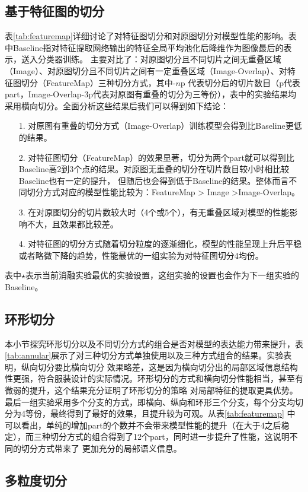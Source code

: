 \subsection{基于特征图的切分}

表\ref{tab:featuremap}详细讨论了对特征图切分和对原图切分对模型性能的影响。表中Baseline指对特征提取网络输出的特征全局平均池化后降维作为图像最后的表示，送入分类器训练。
主要对比了：对原图切分且不同切片之间无重叠区域（Image）、对原图切分且不同切片之间有一定重叠区域（Image-Overlap）、对特征图切分（FeatureMap）三种切分方式，其中-$n$p
代表切分后的切片数目（p代表part，Image-Overlap-3p代表对原图有重叠的切分为三等份），表中的实验结果均采用横向切分。全面分析这些结果后我们可以得到如下结论：
\begin{itemize}
  \item[1.]对原图有重叠的切分方式（Image-Overlap）训练模型会得到比Baseline更低的结果。
  \item[2.]对特征图切分（FeatureMap）的效果显著，切分为两个part就可以得到比Baseline高2到3个点的结果。对原图无重叠的切分在切片数目较小时相比较Baseline也有一定的提升，
    但随后也会得到低于Baseline的结果。整体而言不同切分方式对应的模型性能比较为：FeatureMap > Image >Image-Overlap。
  \item[3.]在对原图切分的切片数较大时（4个或5个），有无重叠区域对模型的性能影响不大，且效果都比较差。
  \item[4.]对特征图的切分方式随着切分粒度的逐渐细化，模型的性能呈现上升后平稳或者略微下降的趋势，性能最优的一组实验为对特征图切分4均份。
\end{itemize}

表中$\star$表示当前消融实验最优的实验设置，这组实验的设置也会作为下一组实验的Baseline。
\subsection{环形切分}
本小节探究环形切分以及不同切分方式的组合是否对模型的表达能力带来提升，表\ref{tab:annular}展示了对三种切分方式单独使用以及三种方式组合的结果。实验表明，纵向切分要比横向切分
效果略差，这是因为横向切分出的局部区域信息结构性更强，符合服装设计的实际情况。环形切分的方式和横向切分性能相当，甚至有微弱的提升，这个结果充分证明了环形切分的策略
对局部特征的提取更具优势。最后一组实验采用多个分支的方式，即横向、纵向和环形三个分支，每个分支均切分为4等份，最终得到了最好的效果，且提升较为可观。从表\ref{tab:featuremap}
中可以看出，单纯的增加part的个数并不会带来模型性能的提升（在大于4之后稳定），而三种切分方式的组合得到了12个part，同时进一步提升了性能，这说明不同的切分方式带来了
更加充分的局部语义信息。

\subsection{多粒度切分}

